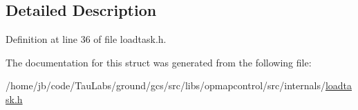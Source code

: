 \subsection{\-Detailed \-Description}


\-Definition at line 36 of file loadtask.\-h.



\-The documentation for this struct was generated from the following file\-:\begin{DoxyCompactItemize}
\item 
/home/jb/code/\-Tau\-Labs/ground/gcs/src/libs/opmapcontrol/src/internals/\hyperlink{loadtask_8h}{loadtask.\-h}\end{DoxyCompactItemize}
